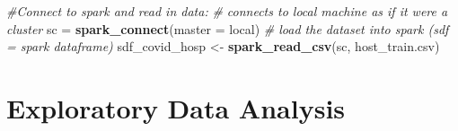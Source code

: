\documentclass[
]{article}
\newenvironment{Shaded}{\begin{snugshade}}{\end{snugshade}}
\newcommand{\AttributeTok}[1]{\textcolor[rgb]{0.13,0.29,0.53}{#1}}
\newcommand{\CommentTok}[1]{\textcolor[rgb]{0.56,0.35,0.01}{\textit{#1}}}
\newcommand{\FunctionTok}[1]{\textcolor[rgb]{0.13,0.29,0.53}{\textbf{#1}}}
\newcommand{\NormalTok}[1]{#1}
\newcommand{\OtherTok}[1]{\textcolor[rgb]{0.56,0.35,0.01}{#1}}
\newcommand{\StringTok}[1]{\textcolor[rgb]{0.31,0.60,0.02}{#1}}
\begin{document}
\begin{Shaded}
\begin{Highlighting}[]
\CommentTok{\#Connect to spark and read in data:}
\CommentTok{\# connects to local machine as if it were a cluster }
\NormalTok{sc }\OtherTok{=} \FunctionTok{spark\_connect}\NormalTok{(}\AttributeTok{master =} \StringTok{\textquotesingle{}local\textquotesingle{}}\NormalTok{)}
\CommentTok{\# load the dataset into spark (sdf = spark dataframe) }
\NormalTok{sdf\_covid\_hosp }\OtherTok{\textless{}{-}} \FunctionTok{spark\_read\_csv}\NormalTok{(sc, }\StringTok{\textquotesingle{}host\_train.csv\textquotesingle{}}\NormalTok{)}
\end{Highlighting}
\end{Shaded}

\section{Exploratory Data Analysis}\label{exploratory-data-analysis}
\end{document}
